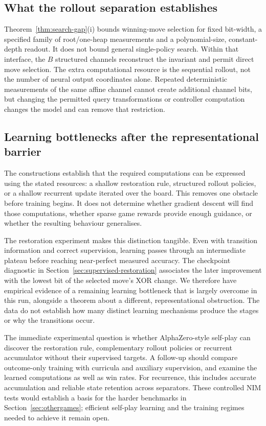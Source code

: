\documentclass[11pt]{article}
\theoremstyle{plain}
\theoremstyle{definition}
\theoremstyle{remark}
\numberwithin{equation}{section}
\begin{document}
\subsection{What the rollout separation establishes}
\label{sec:multipolicy-discussion}
Theorem~\ref{thm:search-gap}(i) bounds winning-move selection for fixed bit-width, a specified family of root/one-heap measurements and a polynomial-size, constant-depth readout. It does not bound general single-policy search. Within that interface, the $B$ structured channels reconstruct the invariant and permit direct move selection.
The extra computational resource is the sequential rollout, not the number of neural output coordinates alone. Repeated deterministic measurements of the same affine channel cannot create additional channel bits, but changing the permitted query transformations or controller computation changes the model and can remove that restriction.

\subsection{Learning bottlenecks after the representational barrier}
\label{sec:opt-gap}

The constructions establish that the required computations can be expressed using the stated resources: a shallow restoration rule, structured rollout policies, or a shallow recurrent update iterated over the board. This removes one obstacle before training begins. It does not determine whether gradient descent will find those computations, whether sparse game rewards provide enough guidance, or whether the resulting behaviour generalises.

The restoration experiment makes this distinction tangible. Even with transition information and correct supervision, learning passes through an intermediate plateau before reaching near-perfect measured accuracy. The checkpoint diagnostic in Section~\ref{sec:supervised-restoration} associates the later improvement with the lowest bit of the selected move's XOR change. We therefore have empirical evidence of a remaining learning bottleneck that is largely overcome in this run, alongside a theorem about a different, representational obstruction. The data do not establish how many distinct learning mechanisms produce the stages or why the transitions occur.

The immediate experimental question is whether AlphaZero-style self-play can discover the restoration rule, complementary rollout policies or recurrent accumulator without their supervised targets. A follow-up should compare outcome-only training with curricula and auxiliary supervision, and examine the learned computations as well as win rates. For recurrence, this includes accurate accumulation and reliable state retention across separators. These controlled NIM tests would establish a basis for the harder benchmarks in Section~\ref{sec:othergames}; efficient self-play learning and the training regimes needed to achieve it remain open.
\end{document}
